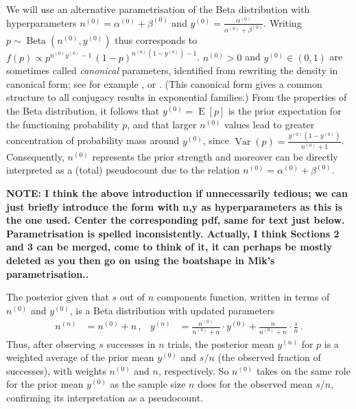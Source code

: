 \documentclass[runningheads,a4paper]{llncs}
\newcommand{\uz}{^{(0)}} %
\newcommand{\un}{^{(n)}} %
\def\yz{y\uz}
\def\yn{y\un}
\def\nz{n\uz}
\def\nn{n\un}
\newcommand{\az}{\alpha\uz}
\newcommand{\bz}{\beta\uz}
\newcommand{\E}{\operatorname{E}}
\newcommand{\V}{\operatorname{Var}}
\newcommand{\be}{\operatorname{Beta}}   %
\begin{document}
We will use an alternative parametrisation of the Beta distribution with hyperparameters
$\nz = \az + \bz$ and $\yz = \frac{\az}{\az+\bz}$.
Writing $p \sim \be(\nz,\yz)$ thus corresponds to
$f(p) \propto p^{\nz\yz-1}\, (1-p)^{\nz(1-\yz)-1}$.
$\nz > 0$ and $\yz \in (0,1)$ are sometimes called \emph{canonical} parameters,
identified from rewriting the density in canonical form;
see for example \cite[pp.~202 and 272f]{2000:bernardosmith}, or \cite[\S 1.2.3.1]{2013:diss-gw}.
(This canonical form gives a common structure to all conjugacy results in exponential families.)
From the properties of the Beta distribution,
it follows that $\yz = \E[p]$ is the prior expectation for the functioning probability $p$,
and that larger $\nz$ values lead to greater concentration of probability mass around $\yz$,
since $\V(p) = \frac{\yz (1-\yz)}{\nz + 1}$.
Consequently, $\nz$ represents the prior strength
and moreover can be directly interpreted as a (total) pseudocount due to the relation $\nz = \az + \bz$.



{\bf NOTE: I think the above introduction if unnecessarily tedious; we can just briefly introduce the form with n,y as hyperparameters
as this is the one used. Center the corresponding pdf, same for text just below. Parametrisation is spelled inconsistently.
Actually, I think Sections 2 and 3 can be merged, come to think of it, it can perhaps be mostly deleted as you then go on using
the boatshape in Mik's parametrisation..}



The posterior given that $s$ out of $n$ components function,
written in terms of $\nz$ and $\yz$,
is a Beta distribution with updated parameters
\begin{align}
\nn &= \nz + n\,, &
\yn &= \frac{\nz}{\nz + n} \cdot \yz + \frac{n}{\nz + n} \cdot \frac{s}{n}\,.
\label{eq:nyupdate}
\end{align}
Thus, after observing $s$ successes in $n$ trials,
the posterior mean $\yn$ for $p$ is a weighted average of
the prior mean $\yz$ and $s/n$ (the observed fraction of successes),
with weights $\nz$ and $n$, respectively.
So $\nz$ takes on the same role for the prior mean $\yz$
as the sample size $n$ does for the observed mean $s/n$,
confirming its interpretation as a pseudocount.
\end{document}
